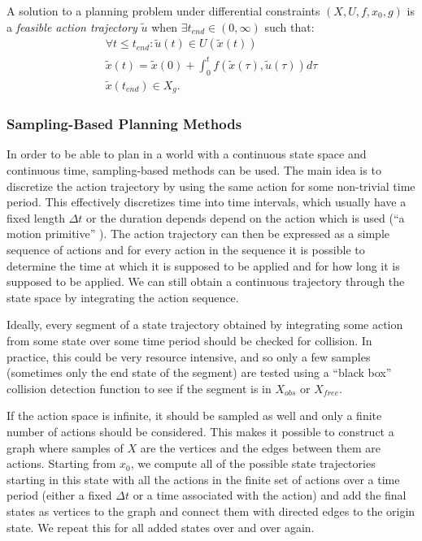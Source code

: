 \begin{defn}
	A solution to a planning problem under differential constraints $\left(X, U, f, x_0, g\right)$ is a \textit{feasible action trajectory} $\tilde{u}$ when $\exists t_{end} \in \left(0, \infty\right)$ such that:
	\begin{gather*}
	\forall t \leq t_{end}: \tilde{u}(t)\in U(\tilde{x}(t)) \\
	\tilde{x}(t) = \tilde{x}(0) + \int_0^t f(\tilde{x}(\tau), \tilde{u}(\tau)) d\tau \\
	\tilde{x}(t_{end})\in X_g.
	\end{gather*}
\end{defn}

\subsubsection{Sampling-Based Planning Methods}

In order to be able to plan in a world with a continuous state space and continuous time, sampling-based methods can be used. The main idea is to discretize the action trajectory by using the same action for some non-trivial time period. This effectively discretizes time into time intervals, which usually have a fixed length $\Delta t$ or the duration depends depend on the action which is used (``a motion primitive'' \cite[Section~14.2.3]{lavalle_2006}). The action trajectory can then be expressed as a simple sequence of actions and for every action in the sequence it is possible to determine the time at which it is supposed to be applied and for how long it is supposed to be applied. We can still obtain a continuous trajectory through the state space by integrating the action sequence.

Ideally, every segment of a state trajectory obtained by integrating some action from some state over some time period should be checked for collision. In practice, this could be very resource intensive, and so only a few samples (sometimes only the end state of the segment) are tested using a ``black box'' collision detection function to see if the segment is in $X_{obs}$ or $X_{free}$.

If the action space is infinite, it should be sampled as well and only a finite number of actions should be considered. This makes it possible to construct a graph where samples of $X$ are the vertices and the edges between them are actions. Starting from $x_0$, we compute all of the possible state trajectories starting in this state with all the actions in the finite set of actions over a time period (either a fixed $\Delta t$ or a time associated with the action) and add the final states as vertices to the graph and connect them with directed edges to the origin state. We repeat this for all added states over and over again.

